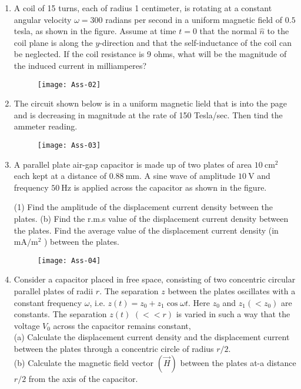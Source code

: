 \begin{enumerate}
\begin{figure}[H]
	\centering
	\texttt{[image: Ass-01]}
\end{figure}
Find an expression for the $x$-component of the force $\vec{F}$ acting on the loop in terms of its velocity $\vec{v}(t), B, L$ and $R$.
\item A coil of 15 turns, each of radius 1 centimeter, is rotating at a constant angular velocity $\omega=300$ radians per second in a uniform magnetic field of $0.5$ tesla, as shown in the figure. Assume at time $t=0$ that the normal $\hat{n}$ to the coil plane is along the $y$-direction and that the self-inductance of the coil can be neglected. If the coil resistance is 9 ohms, what will be the magnitude of the induced current in milliamperes?
\begin{figure}[H]
	\centering
	\texttt{[image: Ass-02]}
\end{figure}
\item The circuit shown below is in a uniform magnetic lield that is into the page and is decreasing in magnitude at the rate of 150 Tesla/sec. Then tind the ammeter reading.
\begin{figure}[H]
	\centering
	\texttt{[image: Ass-03]}
\end{figure}
	\item A parallel plate air-gap capacitor is made up of two plates of area $10 \mathrm{~cm}^{2}$ each kept at a distance of $0.88 \mathrm{~mm}$. A sine wave of amplitude $10 \mathrm{~V}$ and frequency $50 \mathrm{~Hz}$ is applied across the capacitor as shown in the figure.
	 \begin{tasks}(1)
		\task[\textbf{a.}]Find the amplitude of the displacement current density between the plates.
		\task[\textbf{b.}]
		(b) Find the r.m.s value of the displacement current density between the plates.
		\task[\textbf{c.}]Find the average value of the displacement current density (in $\mathrm{mA} / \mathrm{m}^{2}$ ) between the plates.
	\end{tasks}
\begin{figure}[H]
	\centering
	\texttt{[image: Ass-04]}
\end{figure}
	\item Consider a capacitor placed in free space, consisting of two concentric circular parallel plates of radii $r$. The separation $z$ between the plates oscillates with a constant frequency $\omega$, i.e. $z(t)=z_{0}+z_{1} \cos \omega t$. Here $z_{0}$ and $z_{1}\left(<z_{0}\right)$ are constants. The separation $z(t)$ $(<<r)$ is varied in such a way that the voltage $V_{0}$ across the capacitor remains constant,\\
	(a) Calculate the displacement current density and the displacement current between the plates through a concentric circle of radius $r / 2$.\\
	(b) Calculate the magnetic field vector $(\vec{H})$ between the plates at-a distance $r / 2$ from the axis of the capacitor.

\end{enumerate}